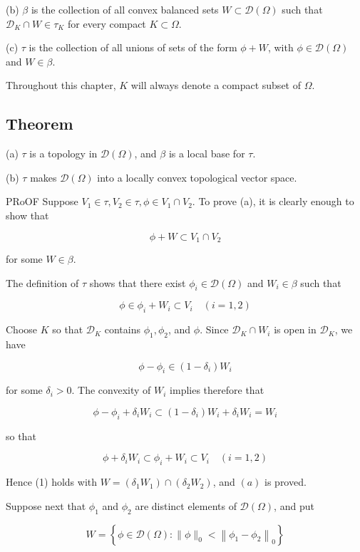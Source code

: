 \documentclass[10pt]{article}
\begin{document}
(b) $\beta$ is the collection of all convex balanced sets $W \subset \mathscr{D}(\Omega)$ such that $\mathscr{D}_{K} \cap W \in \tau_{K}$ for every compact $K \subset \Omega$.

(c) $\tau$ is the collection of all unions of sets of the form $\phi+W$, with $\phi \in \mathscr{D}(\Omega)$ and $W \in \beta$.

Throughout this chapter, $K$ will always denote a compact subset of $\Omega$.

\subsection{Theorem}
(a) $\tau$ is a topology in $\mathscr{D}(\Omega)$, and $\beta$ is a local base for $\tau$.

(b) $\tau$ makes $\mathscr{D}(\Omega)$ into a locally convex topological vector space.

PRoOF Suppose $V_{1} \in \tau, V_{2} \in \tau, \phi \in V_{1} \cap V_{2}$. To prove (a), it is clearly enough to show that

$$
\phi+W \subset V_{1} \cap V_{2}
$$

for some $W \in \beta$.

The definition of $\tau$ shows that there exist $\phi_{i} \in \mathscr{D}(\Omega)$ and $W_{i} \in \beta$ such that

$$
\phi \in \phi_{i}+W_{i} \subset V_{i} \quad(i=1,2)
$$

Choose $K$ so that $\mathscr{D}_{K}$ contains $\phi_{1}, \phi_{2}$, and $\phi$. Since $\mathscr{D}_{K} \cap W_{i}$ is open in $\mathscr{D}_{K}$, we have

$$
\phi-\phi_{i} \in\left(1-\delta_{i}\right) W_{i}
$$

for some $\delta_{i}>0$. The convexity of $W_{i}$ implies therefore that

$$
\phi-\phi_{i}+\delta_{i} W_{i} \subset\left(1-\delta_{i}\right) W_{i}+\delta_{i} W_{i}=W_{i}
$$

so that

$$
\phi+\delta_{i} W_{i} \subset \phi_{i}+W_{i} \subset V_{i} \quad(i=1,2)
$$

Hence (1) holds with $W=\left(\delta_{1} W_{1}\right) \cap\left(\delta_{2} W_{2}\right)$, and $(a)$ is proved.

Suppose next that $\phi_{1}$ and $\phi_{2}$ are distinct elements of $\mathscr{D}(\Omega)$, and put

$$
W=\left\{\phi \in \mathscr{D}(\Omega):\|\phi\|_{0}<\left\|\phi_{1}-\phi_{2}\right\|_{0}\right\}
$$
\end{document}

